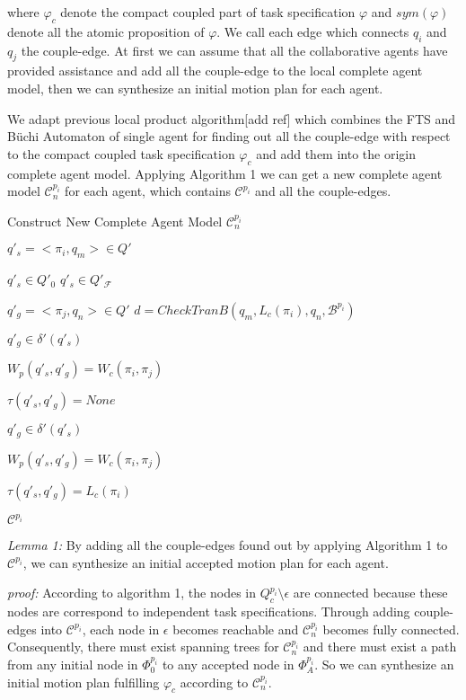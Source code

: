 \documentclass[journal]{IEEEtran}
\begin{document}
where $\varphi_c$ denote the compact coupled part of task specification $\varphi$ and $sym(\varphi)$ denote all the atomic proposition of $\varphi$.
We call each edge which connects $q_i$ and $q_j$ the couple-edge.
At first we can assume that all the collaborative agents have provided assistance and add all the couple-edge to the local complete agent model, then we can synthesize an initial motion plan for each agent.\par
We adapt previous local product algorithm[add ref] which combines the FTS and B\"{u}chi Automaton of single agent for finding out all the couple-edge with respect to the compact coupled task specification $\varphi_c$ and add them into the origin complete agent model. Applying Algorithm 1 we can get a new complete agent model $\mathcal{C}^{p_i}_n$ for each agent, which contains $\mathcal{C}^{p_i}$ and all the couple-edges.\par
\begin{algorithm}
  \caption{Construct New Complete Agent Model $\mathcal{C}^{p_i}_n$}
  {
    $q'_s=<\pi_i,q_m>\in Q'$

    {
        $q'_s\in Q'_0$
    }
    {
        $q'_s\in Q'_\mathcal{F}$
    }
    {
        $q'_g=<\pi_j,q_n>\in Q'$
        $d = CheckTranB(q_m,L_c(\pi_i),q_n,\mathcal{B}^{p_i})$

        {
            $q'_g\in \delta'(q'_s)$

            $W_p(q'_s,q'_g)=W_c(\pi_i,\pi_j)$

            $\tau(q'_s,q'_g) = None$
        }
        \Else
        {
            {
                $q'_g\in \delta'(q'_s)$

                $W_p(q'_s,q'_g)=W_c(\pi_i,\pi_j)$

                $\tau(q'_s,q'_g)=L_c(\pi_i)$
            }
        }
    }
  }
  \Return $\mathcal{C}^{p_i}$
\end{algorithm}

\emph{Lemma 1:} By adding all the couple-edges found out by applying Algorithm 1 to $\mathcal{C}^{p_i}$, we can synthesize an initial accepted motion plan for each agent.\par
\emph{proof:} According to algorithm 1, the nodes in $Q_c^{p_i} \setminus \epsilon$ are connected because these nodes are correspond to independent task specifications. Through adding couple-edges into $\mathcal{C}^{p_i}$, each node in $\epsilon$ becomes reachable and $\mathcal{C}^{p_i}_n$ becomes fully connected. Consequently, there must exist spanning trees for $\mathcal{C}^{p_i}_n$ and there must exist a path from any initial node in $\Phi_0^{p_i}$ to any accepted node in $\Phi_A^{p_i}$. So we can synthesize an initial motion plan fulfilling $\varphi_c$ according to $\mathcal{C}^{p_i}_n$.
\end{document}
